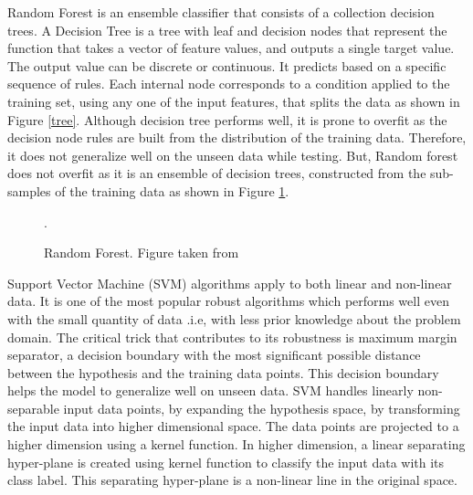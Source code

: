 \documentclass[12pt]{report} %
\begin{document}
Random Forest is an ensemble classifier that consists of a collection decision trees. A Decision Tree is a tree with leaf and decision nodes that represent the function that takes a vector of feature values, and outputs a single target value. The output value can be discrete or continuous. It predicts based on a specific sequence of rules. Each internal node corresponds to a condition applied to the training set, using any one of the input features, that splits the data as shown in Figure \ref{tree}. Although decision tree performs well, it is prone to overfit as the decision node rules are built from the distribution of the training data. Therefore, it does not generalize well on the unseen data while testing. But, Random forest does not overfit as it is an ensemble of decision trees, constructed from the sub-samples of the training data as shown in Figure \ref{rf}. 

\begin{figure}[!tbp]
	\centering
	\caption{Random Forest. Figure taken from \cite{machado2015variables}}.
	\label{rf}
\end{figure}

Support Vector Machine (SVM) algorithms apply to both linear and non-linear data. It is one of the most popular robust algorithms which performs well even with the small quantity of data .i.e, with less prior knowledge about the problem domain. The critical trick that contributes to its robustness is maximum margin separator, a decision boundary with the most significant possible distance between the hypothesis and the training data points. This decision boundary helps the model to generalize well on unseen data. SVM handles linearly non-separable input data points, by expanding the hypothesis space, by transforming the input data into higher dimensional space. The data points are projected to a higher dimension using a kernel function. In higher dimension, a linear separating hyper-plane is created using kernel function to classify the input data with its class label. This separating hyper-plane is a non-linear line in the original space. 
\end{document}
